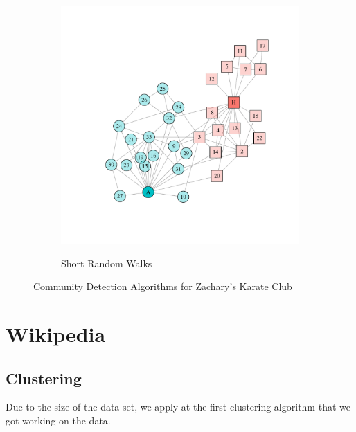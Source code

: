 \begin{figure}
\begin{subfigure}[b]{0.32\textwidth}
\label{fig:spinglass}
\end{subfigure}
\hfill
\begin{subfigure}[b]{0.32\textwidth}
\caption{Short Random Walks}
\includegraphics[width=\textwidth,trim={0.75in 0.75in 0.75in 0.75in}, clip=True]{walktrap.pdf}
\label{fig:walktrap}
\end{subfigure}
\caption{Community Detection Algorithms for Zachary's Karate Club}
\end{figure}

\section{Wikipedia}
\subsection{Clustering}
Due to the size of the data-set, we apply at the first clustering algorithm that we got working on the data.




